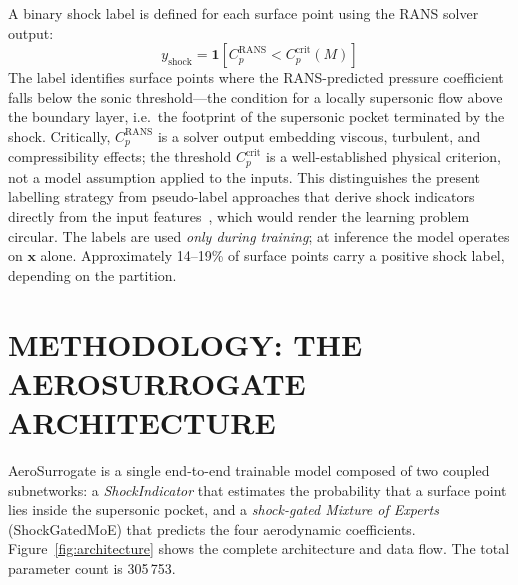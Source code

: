 \documentclass{WCCM-ECCOMAS_2026_Full_Paper}
\begin{document}
A binary shock label is defined for each surface point using the RANS
solver output:
\begin{equation}
  y_{\mathrm{shock}} =
    \mathbf{1}\!\left[C_{p}^{\mathrm{RANS}} <
                      C_{p}^{\mathrm{crit}}(M)\right]
  \label{eq:labels}
\end{equation}
The label identifies surface points where the RANS-predicted pressure
coefficient falls below the sonic threshold---the condition for a
locally supersonic flow above the boundary layer, i.e.\ the footprint
of the supersonic pocket terminated by the shock.  Critically,
$C_{p}^{\mathrm{RANS}}$ is a solver output embedding viscous,
turbulent, and compressibility effects; the threshold
$C_{p}^{\mathrm{crit}}$ is a well-established physical criterion, not
a model assumption applied to the inputs.  This distinguishes the
present labelling strategy from pseudo-label approaches that derive
shock indicators directly from the input
features~\cite{Ray2018,Discacciati2020}, which would render the
learning problem circular.  The labels are used \emph{only during
training}; at inference the model operates on $\mathbf{x}$ alone.
Approximately 14--19\% of surface points carry a positive shock
label, depending on the partition.

\section{METHODOLOGY: THE AEROSURROGATE ARCHITECTURE}
\label{sec:method}

AeroSurrogate is a single end-to-end trainable model composed of two
coupled subnetworks: a \emph{ShockIndicator} that estimates the
probability that a surface point lies inside the supersonic pocket,
and a \emph{shock-gated Mixture of Experts} (ShockGatedMoE) that
predicts the four aerodynamic coefficients.
Figure~\ref{fig:architecture} shows the complete architecture and
data flow.  The total parameter count is 305\,753.
\end{document}
